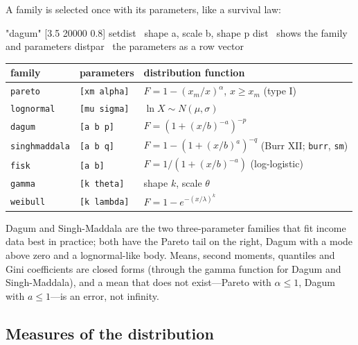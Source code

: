 \documentclass[11pt,letterpaper]{article}
\newcommand{\code}[1]{\texttt{#1}}
\begin{document}
A family is selected once with its parameters, like a survival law:
\begin{rpn}
"dagum" [3.5 20000 0.8] setdist          \ shape a, scale b, shape p
dist                                     \ shows the family and parameters
distpar                                  \ the parameters as a row vector
\end{rpn}
\begin{center}\small
\begin{tabular}{@{}ll>{\raggedright\arraybackslash}p{}@{}}
\toprule
family & parameters & distribution function \\
\midrule
\code{pareto} & \code{[xm alpha]} & $F = 1 - (x_m/x)^\alpha$, $x \ge x_m$ (type I) \\
\code{lognormal} & \code{[mu sigma]} & $\ln X \sim N(\mu, \sigma)$ \\
\code{dagum} & \code{[a b p]} & $F = (1 + (x/b)^{-a})^{-p}$ \\
\code{singhmaddala} & \code{[a b q]} & $F = 1 - (1 + (x/b)^a)^{-q}$ (Burr XII; \code{burr}, \code{sm}) \\
\code{fisk} & \code{[a b]} & $F = 1/(1 + (x/b)^{-a})$ (log-logistic) \\
\code{gamma} & \code{[k theta]} & shape $k$, scale $\theta$ \\
\code{weibull} & \code{[k lambda]} & $F = 1 - e^{-(x/\lambda)^k}$ \\
\bottomrule
\end{tabular}
\end{center}
Dagum and Singh-Maddala are the two three-parameter families that fit income data best in practice; both have the Pareto tail on the right, Dagum with a mode above zero and a lognormal-like body. Means, second moments, quantiles and Gini coefficients are closed forms (through the gamma function for Dagum and Singh-Maddala), and a mean that does not exist---Pareto with $\alpha \le 1$, Dagum with $a \le 1$---is an error, not infinity.

\subsection{Measures of the distribution}
\end{document}
